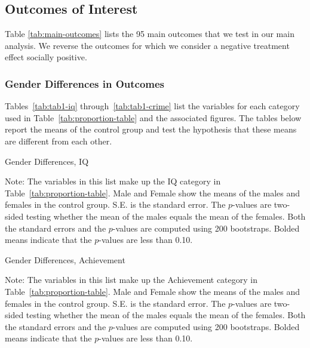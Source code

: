 \subsection{Outcomes of Interest}

\noindent Table \ref{tab:main-outcomes} lists the 95 main outcomes that we test in our main analysis. We reverse the outcomes for which we consider a negative treatment effect socially positive. \\

\singlespacing

\doublespacing

\subsubsection{Gender Differences in Outcomes}
\label{appendix:gdiff-outcome-list}

Tables~\ref{tab:tab1-iq} through~\ref{tab:tab1-crime} list the variables for each category used in Table~\ref{tab:proportion-table} and the associated figures. The tables below report the means of the control group and test the hypothesis that these means are different from each other.

\begin{table}
\centering
\caption{Gender Differences, IQ}\label{tab:tab1-iq}
\begin{adjustbox}{width=0.8\textwidth}
\begin{threeparttable}

\begin{tablenotes}
\footnotesize
\item Note: The variables in this list make up the IQ category in Table~\ref{tab:proportion-table}. Male and Female show the means of the males and females in the control group. S.E. is the standard error. The $p$-values are two-sided testing whether the mean of the males equals the mean of the females. Both the standard errors and the $p$-values are computed using 200 bootstraps. Bolded means indicate that the $p$-values are less than 0.10.
\end{tablenotes}
\end{threeparttable}
\end{adjustbox}
\end{table}


\begin{table}
\centering
\caption{Gender Differences, Achievement}\label{tab:tab1-ach}
\begin{threeparttable}

\begin{tablenotes}
\footnotesize
\item Note: The variables in this list make up the Achievement category in Table~\ref{tab:proportion-table}. Male and Female show the means of the males and females in the control group. S.E. is the standard error. The $p$-values are two-sided testing whether the mean of the males equals the mean of the females. Both the standard errors and the $p$-values are computed using 200 bootstraps. Bolded means indicate that the $p$-values are less than 0.10.
\end{tablenotes}
\end{threeparttable}
\end{table}

